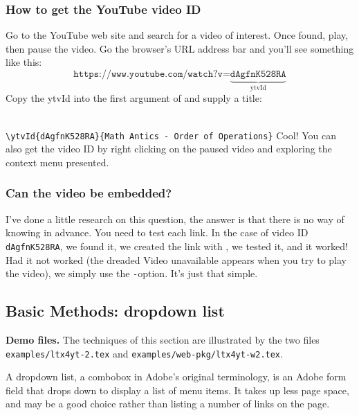 \documentclass{article}
\makeatletter
\renewenvironment{quote}[1][]
   {\def\@rgi{#1}\ifx\@rgi\@empty
    \let\rghtm\@empty\else\def\rghtm{\rightmargin\leftmargin}\fi
    \list{}{\rghtm} %
    \item\relax}
   {\endlist}
\newcommand{\YT}{\textsf{YouTube}}
\makeatother
\begin{document}
\subsubsection{How to get the {\YT} video ID}

Go to the {\YT} web site and search for a video of interest. Once found, play, then pause
the video. Go the browser's URL address bar and you'll see something like this:
\begin{equation*}
  \texttt{https://www.youtube.com/watch?v=$\underset{\text{ytvId}}{\underbrace{\texttt{dAgfnK528RA}}}$}
\end{equation*}
Copy the ytvId into the first argument of  and supply a title: %
\begin{quote}
  \\
  \verb~\ytvId{dAgfnK528RA}{Math Antics - Order of Operations}~
\end{quote}
Cool! You can also get the video ID by right clicking on the paused video and
exploring the context menu presented.

\subsubsection{Can the video be embedded?}

I've done a little research on this question, the answer is that there is no
way of knowing in advance. You need to test each link. In the case of video
ID \texttt{dAgfnK528RA}, we found it, we created the link with ,
we tested it, and it worked! Had it not worked (the dreaded \textsf{Video
unavailable} appears when you try to play the video), we simply use the
\texttt*-option. It's just that simple.

\subsection{Basic Methods: dropdown list}

\textbf{Demo files.} The techniques of this section are illustrated by the two files
\texttt{examples/\allowbreak ltx4yt-2.tex} and \texttt{examples/web-pkg/ltx4yt-w2.tex}.

\newtopic\noindent A dropdown list, a combobox in Adobe's original terminology, is an Adobe form field
that drops down to display a list of menu items. It takes up less page space,
and may be a good choice rather than listing a number of links on the page.
\end{document}

